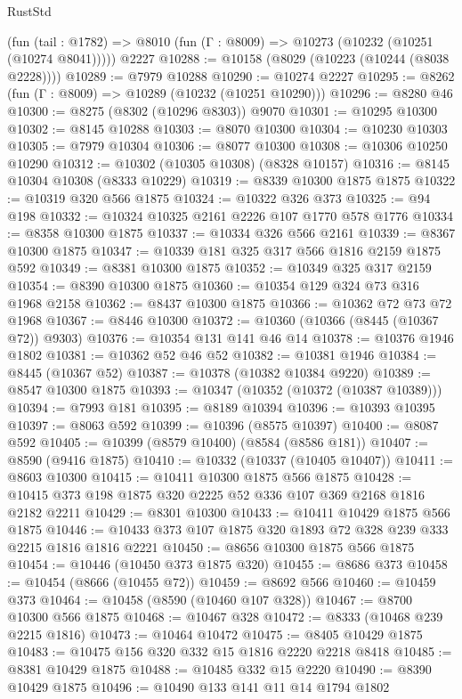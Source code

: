 \begin{lexlean}{RustStd}
\begin{coremodule}
    (fun (tail : @1782) => @8010 (fun (Γ : @8009) => @10273 (@10232 (@10251 (@10274 @8041)))))
    @2227
@10288 := @10158 (@8029 (@10223 (@10244 (@8038 @2228))))
@10289 := @7979 @10288
@10290 := @10274 @2227
@10295 := @8262 (fun (Γ : @8009) => @10289 (@10232 (@10251 @10290)))
@10296 := @8280 @46
@10300 := @8275 (@8302 (@10296 @8303)) @9070
@10301 := @10295 @10300
@10302 := @8145 @10288
@10303 := @8070 @10300
@10304 := @10230 @10303
@10305 := @7979 @10304
@10306 := @8077 @10300
@10308 := @10306 @10250 @10290
@10312 := @10302 (@10305 @10308) (@8328 @10157)
@10316 := @8145 @10304 @10308 (@8333 @10229)
@10319 := @8339 @10300 @1875 @1875
@10322 := @10319 @320 @566 @1875
@10324 := @10322 @326 @373
@10325 := @94 @198
@10332 := @10324 @10325 @2161 @2226 @107 @1770 @578 @1776
@10334 := @8358 @10300 @1875
@10337 := @10334 @326 @566 @2161
@10339 := @8367 @10300 @1875
@10347 := @10339 @181 @325 @317 @566 @1816 @2159 @1875 @592
@10349 := @8381 @10300 @1875
@10352 := @10349 @325 @317 @2159
@10354 := @8390 @10300 @1875
@10360 := @10354 @129 @324 @73 @316 @1968 @2158
@10362 := @8437 @10300 @1875
@10366 := @10362 @72 @73 @72 @1968
@10367 := @8446 @10300
@10372 := @10360 (@10366 (@8445 (@10367 @72)) @9303)
@10376 := @10354 @131 @141 @46 @14
@10378 := @10376 @1946 @1802
@10381 := @10362 @52 @46 @52
@10382 := @10381 @1946
@10384 := @8445 (@10367 @52)
@10387 := @10378 (@10382 @10384 @9220)
@10389 := @8547 @10300 @1875
@10393 := @10347 (@10352 (@10372 (@10387 @10389)))
@10394 := @7993 @181
@10395 := @8189 @10394
@10396 := @10393 @10395
@10397 := @8063 @592
@10399 := @10396 (@8575 @10397)
@10400 := @8087 @592
@10405 := @10399 (@8579 @10400) (@8584 (@8586 @181))
@10407 := @8590 (@9416 @1875)
@10410 := @10332 (@10337 (@10405 @10407))
@10411 := @8603 @10300
@10415 := @10411 @10300 @1875 @566 @1875
@10428 := @10415 @373 @198 @1875 @320 @2225 @52 @336 @107 @369 @2168 @1816 @2182 @2211
@10429 := @8301 @10300
@10433 := @10411 @10429 @1875 @566 @1875
@10446 := @10433 @373 @107 @1875 @320 @1893 @72 @328 @239 @333 @2215 @1816 @1816 @2221
@10450 := @8656 @10300 @1875 @566 @1875
@10454 := @10446 (@10450 @373 @1875 @320)
@10455 := @8686 @373
@10458 := @10454 (@8666 (@10455 @72))
@10459 := @8692 @566
@10460 := @10459 @373
@10464 := @10458 (@8590 (@10460 @107 @328))
@10467 := @8700 @10300 @566 @1875
@10468 := @10467 @328
@10472 := @8333 (@10468 @239 @2215 @1816)
@10473 := @10464 @10472
@10475 := @8405 @10429 @1875
@10483 := @10475 @156 @320 @332 @15 @1816 @2220 @2218 @8418
@10485 := @8381 @10429 @1875
@10488 := @10485 @332 @15 @2220
@10490 := @8390 @10429 @1875
@10496 := @10490 @133 @141 @11 @14 @1794 @1802

\end{coremodule}
\end{lexlean}
